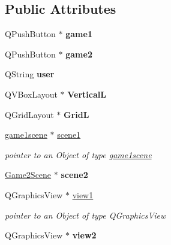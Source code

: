 \subsection*{Public Attributes}
\begin{DoxyCompactItemize}
\item 
\hypertarget{classgamesWidget_a96c63105c5ac277fc2549027d34624de}{Q\-Push\-Button $\ast$ {\bfseries game1}}\label{classgamesWidget_a96c63105c5ac277fc2549027d34624de}

\item 
\hypertarget{classgamesWidget_aebf0664e037955f85a1e46aa8d48ebd2}{Q\-Push\-Button $\ast$ {\bfseries game2}}\label{classgamesWidget_aebf0664e037955f85a1e46aa8d48ebd2}

\item 
\hypertarget{classgamesWidget_af077298d98486e4f58be7738d10ebd3c}{Q\-String {\bfseries user}}\label{classgamesWidget_af077298d98486e4f58be7738d10ebd3c}

\item 
\hypertarget{classgamesWidget_a68f0846d48f0c645eaa2dd1800405bd5}{Q\-V\-Box\-Layout $\ast$ {\bfseries Vertical\-L}}\label{classgamesWidget_a68f0846d48f0c645eaa2dd1800405bd5}

\item 
\hypertarget{classgamesWidget_ae91fa77d8e2d034136c58a1872b692e0}{Q\-Grid\-Layout $\ast$ {\bfseries Grid\-L}}\label{classgamesWidget_ae91fa77d8e2d034136c58a1872b692e0}

\item 
\hypertarget{classgamesWidget_a591d0422974904742d3c3d099e9e7439}{\hyperlink{classgame1scene}{game1scene} $\ast$ \hyperlink{classgamesWidget_a591d0422974904742d3c3d099e9e7439}{scene1}}\label{classgamesWidget_a591d0422974904742d3c3d099e9e7439}

\begin{DoxyCompactList}\small\item\em pointer to an Object of type \hyperlink{classgame1scene}{game1scene} \end{DoxyCompactList}\item 
\hypertarget{classgamesWidget_a376022b09f26245884e94e317b7cfed8}{\hyperlink{classGame2Scene}{Game2\-Scene} $\ast$ {\bfseries scene2}}\label{classgamesWidget_a376022b09f26245884e94e317b7cfed8}

\item 
\hypertarget{classgamesWidget_a273cf731a3523ad946313677890151a1}{Q\-Graphics\-View $\ast$ \hyperlink{classgamesWidget_a273cf731a3523ad946313677890151a1}{view1}}\label{classgamesWidget_a273cf731a3523ad946313677890151a1}

\begin{DoxyCompactList}\small\item\em pointer to an Object of type Q\-Graphics\-View \end{DoxyCompactList}\item 
\hypertarget{classgamesWidget_a431bcc98e9763d5fa02240e44e7e1844}{Q\-Graphics\-View $\ast$ {\bfseries view2}}\label{classgamesWidget_a431bcc98e9763d5fa02240e44e7e1844}

\end{DoxyCompactItemize}


